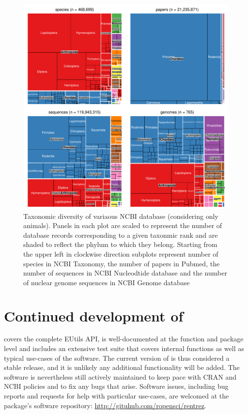 \begin{figure}
\begin{center}
\includegraphics{Fig1}
\caption{Taxonomic diversity of variaous NCBI database (considering only
animals). Panels in each plot are scaled to represent the number of database
records corresponding to a given taxonmic rank and are shaded to reflect the
phylum to which they belong. Starting from the upper left in clockwise direction
subplots represent number of species in NCBI Taxonomy, the number of papers 
in Pubmed, the number of sequences in NCBI Nucleodtide database and the number of 
nuclear genome sequences in NCBI Genome database}
\label{fig:tm}
\end{center}
\end{figure}

\section{Continued development of }

 covers the complete EUtils API, is well-documented at the function
and package level and includes an extensive test suite that covers
internal functions as well as typical use-cases of the software. The current
version of  is thus considered a stable release, and it is
unlikely any additional functionality will be added. The software is nevertheless
still actively maintained to keep pace with CRAN and NCBI policies and to fix
any bugs that arise. Software issues, including bug reports and requests for help 
with particular use-cases, are welcomed at the package's software repository:
\url{http://gituhub.com/ropensci/rentrez}.

